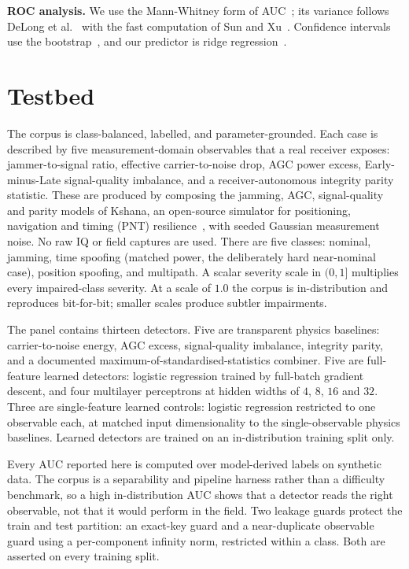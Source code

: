 \documentclass[conference]{IEEEtran}
\begin{document}
\textbf{ROC analysis.}
We use the Mann-Whitney form of AUC~\cite{hanley,bradley}; its variance follows
DeLong et al.~\cite{delong} with the fast computation of Sun and Xu~\cite{sunxu}.
Confidence intervals use the bootstrap~\cite{efron}, and our predictor is ridge
regression~\cite{ridge}.

\section{Testbed}
The corpus is class-balanced, labelled, and parameter-grounded. Each case is
described by five measurement-domain observables that a real receiver exposes:
jammer-to-signal ratio, effective carrier-to-noise drop, AGC power excess,
Early-minus-Late signal-quality imbalance, and a receiver-autonomous integrity
parity statistic. These are produced by composing the jamming, AGC, signal-quality
and parity models of Kshana, an open-source simulator for positioning, navigation
and timing (PNT) resilience~\cite{kshana}, with seeded Gaussian measurement noise.
No raw IQ or field captures are used. There are five classes: nominal, jamming, time
spoofing (matched power, the deliberately hard near-nominal case), position
spoofing, and multipath. A scalar severity scale in $(0,1]$ multiplies every
impaired-class severity. At a scale of $1.0$ the corpus is in-distribution and
reproduces bit-for-bit; smaller scales produce subtler impairments.

The panel contains thirteen detectors. Five are transparent physics baselines:
carrier-to-noise energy, AGC excess, signal-quality imbalance, integrity parity,
and a documented maximum-of-standardised-statistics combiner. Five are full-feature
learned detectors: logistic regression trained by full-batch gradient descent, and
four multilayer perceptrons at hidden widths of $4$, $8$, $16$ and $32$. Three are
single-feature learned controls: logistic regression restricted to one observable
each, at matched input dimensionality to the single-observable physics baselines.
Learned detectors are trained on an in-distribution training split only.

Every AUC reported here is computed over model-derived labels on synthetic data.
The corpus is a separability and pipeline harness rather than a difficulty
benchmark, so a high in-distribution AUC shows that a detector reads the right
observable, not that it would perform in the field. Two leakage guards protect the
train and test partition: an exact-key guard and a near-duplicate observable guard
using a per-component infinity norm, restricted within a class. Both are asserted
on every training split.
\end{document}
